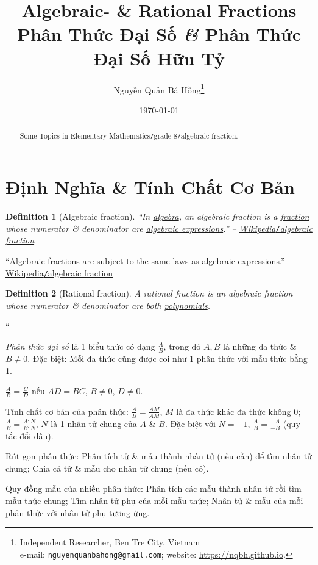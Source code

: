 \documentclass{article}
\title{Algebraic- \& Rational Fractions\\Phân Thức Đại Số \textit{\&} Phân Thức Đại Số Hữu Tỷ}
\author{Nguyễn Quản Bá Hồng\footnote{Independent Researcher, Ben Tre City, Vietnam\\e-mail: \texttt{nguyenquanbahong@gmail.com}; website: \url{https://nqbh.github.io}.}}
\date{\today}
\numberwithin{equation}{section}
\newtheorem{definition}{Definition}[section]
\begin{document}
\maketitle
\begin{abstract}
	Some Topics in Elementary Mathematics\texttt{/}grade 8\texttt{/}algebraic fraction.
\end{abstract}
\setcounter{secnumdepth}{4}
\setcounter{tocdepth}{3}
\tableofcontents


\section{Định Nghĩa \& Tính Chất Cơ Bản}

\begin{definition}[Algebraic fraction]
	``In \href{https://en.wikipedia.org/wiki/Algebra}{algebra}, an \emph{algebraic fraction} is a \href{https://en.wikipedia.org/wiki/Fraction_(mathematics)}{fraction} whose numerator \& denominator are \href{https://en.wikipedia.org/wiki/Algebraic_expression}{algebraic expressions}.'' -- \href{https://en.wikipedia.org/wiki/Algebraic_fraction}{Wikipedia\emph{\texttt{/}}algebraic fraction}
\end{definition}
``Algebraic fractions are subject to the same laws as \href{https://en.wikipedia.org/wiki/Arithmetic_fraction}{algebraic expressions}.'' -- \href{https://en.wikipedia.org/wiki/Algebraic_fraction}{Wikipedia\texttt{/}algebraic fraction}

\begin{definition}[Rational fraction]
	A \emph{rational fraction} is an algebraic fraction whose numerator \& denominator are both \href{https://en.wikipedia.org/wiki/Polynomial}{polynomials}.
\end{definition}
``\begin{enumerate*}
	\item[\textbf{1.}] \textit{Phân thức đại số} là 1 biểu thức có dạng $\frac{A}{B}$, trong đó $A,B$ là những đa thức \& $B\ne 0$. Đặc biệt: Mỗi đa thức cũng được coi như 1 phân thức với mẫu thức bằng 1.
	\item[\textbf{2.}] $\frac{A}{B} = \frac{C}{D}$ nếu $AD = BC$, $B\ne 0$, $D\ne 0$.
	\item[\textbf{3.}] Tính chất cơ bản của phân thức: $\frac{A}{B} = \frac{AM}{AM}$, $M$ là đa thức khác đa thức không 0; $\frac{A}{B} = \frac{A:N}{B:N}$, $N$ là 1 nhân tử chung của $A$ \& $B$. Đặc biệt với $N = -1$, $\frac{A}{B} = \frac{-A}{-B}$ (quy tắc đổi dấu).
	\item[\textbf{4.}] Rút gọn phân thức: Phân tích tử \& mẫu thành nhân tử (nếu cần) để tìm nhân tử chung; Chia cả tử \& mẫu cho nhân tử chung (nếu có).
	\item[\textbf{5.}] Quy đồng mẫu của nhiều phân thức: Phân tích các mẫu thành nhân tử rồi tìm mẫu thức chung; Tìm nhân tử phụ của mỗi mẫu thức; Nhân tử \& mẫu của mỗi phân thức với nhân tử phụ tương ứng.
\end{enumerate*}
\end{document}
